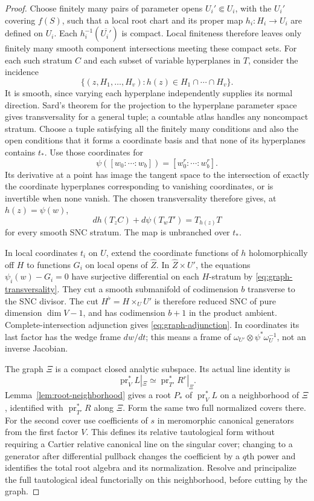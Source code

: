\begin{proof}
Choose finitely many pairs of parameter opens \(U_i'\Subset U_i\), with
the \(U_i'\) covering \(f(S)\), such that a local root chart and its
proper map \(h_i:H_i\to U_i\) are defined on \(U_i\).  Each
\(h_i^{-1}(\overline{U_i'})\) is compact.  Local finiteness therefore
leaves only finitely many smooth component intersections meeting these
compact sets.  For each such stratum \(C\) and each subset of
variable hyperplanes in \(T\), consider the incidence
\[
 \{(z,H_1,\ldots,H_v):h(z)\in H_1\cap\cdots\cap H_v\}.
\]
It is smooth, since varying each hyperplane independently supplies its
normal direction.  Sard's theorem for the projection to the hyperplane
parameter space gives transversality for a general tuple; a countable
atlas handles any noncompact stratum.  Choose a tuple satisfying all
the finitely many conditions and also the open conditions that it forms
a coordinate basis and that none of its hyperplanes contains \(t_*\).
Use those coordinates for
\[
 \psi([w_0:\cdots:w_b])=[w_0^r:\cdots:w_b^r].
\]
Its derivative at a point has image the tangent space to the intersection
of exactly the coordinate hyperplanes corresponding to vanishing
coordinates, or is invertible when none vanish.  The chosen transversality
therefore gives, at \(h(z)=\psi(w)\),
\begin{equation}\label{eq:graph-transversality}
 dh(T_zC)+d\psi(T_wT')=T_{h(z)}T
\end{equation}
for every smooth SNC stratum.  The map is unbranched over \(t_*\).

In local coordinates \(t_i\) on \(U\), extend the coordinate functions
of \(h\) holomorphically off \(H\) to functions \(G_i\) on local opens
of \(\widehat Z\).  In \(\widehat Z\times U'\), the equations
\(\psi_i(w)-G_i=0\) have surjective differential on each \(H\)-stratum
by \eqref{eq:graph-transversality}.  They cut a smooth submanifold of
codimension \(b\) transverse to the SNC divisor.  The cut
\(H^\flat=H\times_U U'\) is therefore reduced SNC of pure dimension
\(\dim V-1\), and has codimension \(b+1\) in the product ambient.
Complete-intersection adjunction gives \eqref{eq:graph-adjunction}.
In coordinates its last factor has the wedge frame \(dw/dt\); this means
a frame of \(\omega_{U'}\otimes\psi^*\omega_U^{-1}\), not an inverse
Jacobian.

The graph \(\Xi\) is a compact closed analytic subspace.  Its actual
line identity is
\[
 \operatorname{pr}_V^*L|_\Xi\simeq
 \operatorname{pr}_{T'}^*R^r|_\Xi.
\]
Lemma~\ref{lem:root-neighborhood} gives a root \(P_*\) of
\(\operatorname{pr}_V^*L\) on a neighborhood of \(\Xi\), identified
with \(\operatorname{pr}_{T'}^*R\) along \(\Xi\).  Form the same two
full normalized covers there.  For the second cover use coefficients
of \(s\) in meromorphic canonical generators from the first factor
\(V\).  This defines its relative tautological form without requiring a
Cartier relative canonical line on the singular cover; changing to a
generator after differential pullback changes the coefficient by a
\(q\)th power and identifies the total root algebra and its normalization.
Resolve and principalize the full tautological ideal functorially on this neighborhood, before
cutting by the graph.


\end{proof}
